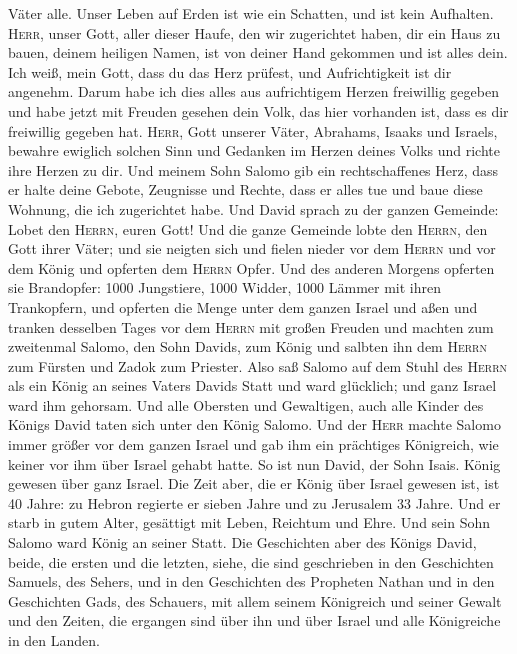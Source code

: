 Väter alle. Unser Leben auf Erden ist wie ein Schatten, und ist kein
Aufhalten.  \textsc{Herr}, unser Gott, aller dieser
Haufe, den wir zugerichtet haben, dir ein Haus zu bauen, deinem heiligen
Namen, ist von deiner Hand gekommen und ist alles dein. 
Ich weiß, mein Gott, dass du das Herz prüfest, und Aufrichtigkeit ist
dir angenehm. Darum habe ich dies alles aus aufrichtigem Herzen
freiwillig gegeben und habe jetzt mit Freuden gesehen dein Volk, das
hier vorhanden ist, dass es dir freiwillig gegeben hat. 
\textsc{Herr}, Gott unserer Väter, Abrahams, Isaaks und Israels, bewahre
ewiglich solchen Sinn und Gedanken im Herzen deines Volks und richte
ihre Herzen zu dir.  Und meinem Sohn Salomo gib ein
rechtschaffenes Herz, dass er halte deine Gebote, Zeugnisse und Rechte,
dass er alles tue und baue diese Wohnung, die ich zugerichtet habe.
 Und David sprach zu der ganzen Gemeinde: Lobet den
\textsc{Herrn}, euren Gott! Und die ganze Gemeinde lobte den
\textsc{Herrn}, den Gott ihrer Väter; und sie neigten sich und fielen
nieder vor dem \textsc{Herrn} und vor dem König  und
opferten dem \textsc{Herrn} Opfer. Und des anderen Morgens opferten sie
Brandopfer: 1000 Jungstiere, 1000 Widder, 1000 Lämmer mit ihren
Trankopfern, und opferten die Menge unter dem ganzen Israel
 und aßen und tranken desselben Tages vor dem
\textsc{Herrn} mit großen Freuden und machten zum zweitenmal Salomo, den
Sohn Davids, zum König und salbten ihn dem \textsc{Herrn} zum Fürsten
und Zadok zum Priester.  Also saß Salomo auf dem Stuhl
des \textsc{Herrn} als ein König an seines Vaters Davids Statt und ward
glücklich; und ganz Israel ward ihm gehorsam.  Und alle
Obersten und Gewaltigen, auch alle Kinder des Königs David taten sich
unter den König Salomo.  Und der \textsc{Herr} machte
Salomo immer größer vor dem ganzen Israel und gab ihm ein prächtiges
Königreich, wie keiner vor ihm über Israel gehabt hatte. 
So ist nun David, der Sohn Isais. König gewesen über ganz Israel.
 Die Zeit aber, die er König über Israel gewesen ist, ist
40 Jahre: zu Hebron regierte er sieben Jahre und zu Jerusalem 33 Jahre.
 Und er starb in gutem Alter, gesättigt mit Leben,
Reichtum und Ehre. Und sein Sohn Salomo ward König an seiner Statt.
 Die Geschichten aber des Königs David, beide, die ersten
und die letzten, siehe, die sind geschrieben in den Geschichten Samuels,
des Sehers, und in den Geschichten des Propheten Nathan und in den
Geschichten Gads, des Schauers,  mit allem seinem
Königreich und seiner Gewalt und den Zeiten, die ergangen sind über ihn
und über Israel und alle Königreiche in den Landen.
